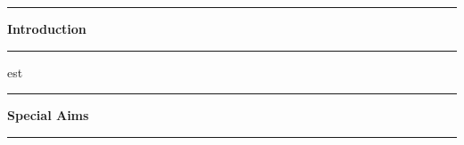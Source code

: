 \documentclass[11pt]{article}
\newcommand\question[2]{\vspace{.25in}\hrule\textbf{#1}\vspace{.5em}\hrule\vspace{.10in}}
\begin{document}
\raggedright
\newcommand\NAME{Christine Baek, Qi Chu, Yanyu Liang}  %

\question{Introduction}

test

\question{Special Aims}


\question{Work Plan}
\end{document}
